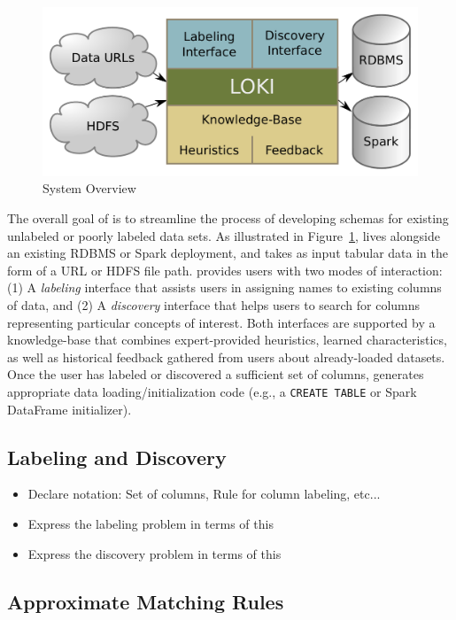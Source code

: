 
\begin{figure}
\centering
\includegraphics[width=0.8\columnwidth]{graphics/system.pdf}
\caption{System Overview}
\label{fig:overview}
\end{figure}

The overall goal of \systemname is to streamline the process of developing schemas for existing unlabeled or poorly labeled data sets.  
As illustrated in Figure~\ref{fig:overview}, \systemname lives alongside an existing RDBMS or Spark deployment, and takes as input tabular data in the form of a URL or HDFS file path.
\systemname provides users with two modes of interaction: (1) A \emph{labeling} interface that assists users in assigning names to existing columns of data, and (2) A \emph{discovery} interface that helps users to search for columns representing particular concepts of interest.  
Both interfaces are supported by a knowledge-base that combines expert-provided heuristics, learned characteristics, as well as historical feedback gathered from users about already-loaded datasets.
Once the user has labeled or discovered a sufficient set of columns, \systemname generates appropriate data loading/initialization code (e.g., a \texttt{CREATE TABLE} or Spark DataFrame initializer).  


\subsection{Labeling and Discovery}

\begin{itemize}
  \item Declare notation: Set of columns, Rule for column labeling, etc...
  \item Express the labeling problem in terms of this
  \item Express the discovery problem in terms of this
\end{itemize}


\subsection{Approximate Matching Rules}

